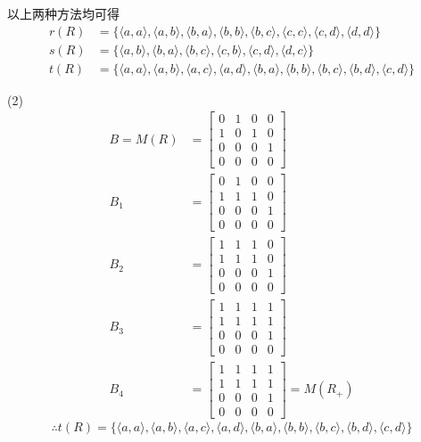 \documentclass[UTF8]{ctexart}
\begin{document}
    以上两种方法均可得
    \begin{align*}
        r(R) & = \{ \langle a,a \rangle , \langle a,b \rangle , \langle b,a \rangle , \langle b,b \rangle , \langle b,c \rangle , \langle c,c \rangle , \langle c,d \rangle , \langle d,d \rangle \} \\
        s(R) & = \{ \langle a,b \rangle , \langle b,a \rangle , \langle b,c \rangle , \langle c,b \rangle , \langle c,d \rangle , \langle d,c \rangle \} \\
        t(R) & = \{ \langle a,a \rangle , \langle a,b \rangle , \langle a,c \rangle , \langle a,d \rangle , \langle b,a \rangle , \langle b,b \rangle , \langle b,c \rangle , \langle b,d \rangle , \langle c,d \rangle \} 
    \end{align*}

    (2) 
    \begin{align*}
        B = M(R) & = \begin{bmatrix}
            0 & 1 & 0 & 0 \\
            1 & 0 & 1 & 0 \\
            0 & 0 & 0 & 1 \\
            0 & 0 & 0 & 0
        \end{bmatrix} \\
        B_1 & = \begin{bmatrix}
            0 & 1 & 0 & 0 \\
            1 & 1 & 1 & 0 \\
            0 & 0 & 0 & 1 \\
            0 & 0 & 0 & 0
        \end{bmatrix} \\
        B_2 & = \begin{bmatrix}
            1 & 1 & 1 & 0 \\
            1 & 1 & 1 & 0 \\
            0 & 0 & 0 & 1 \\
            0 & 0 & 0 & 0
        \end{bmatrix} \\
        B_3 & = \begin{bmatrix}
            1 & 1 & 1 & 1 \\
            1 & 1 & 1 & 1 \\
            0 & 0 & 0 & 1 \\
            0 & 0 & 0 & 0
        \end{bmatrix} \\
        B_4 & = \begin{bmatrix}
            1 & 1 & 1 & 1 \\
            1 & 1 & 1 & 1 \\
            0 & 0 & 0 & 1 \\
            0 & 0 & 0 & 0
        \end{bmatrix} = M(R_+)
    \end{align*}
    $$\therefore t(R) = \{ \langle a,a \rangle , \langle a,b \rangle , \langle a,c \rangle , \langle a,d \rangle , \langle b,a \rangle , \langle b,b \rangle , \langle b,c \rangle , \langle b,d \rangle , \langle c,d \rangle \} $$
\end{document}

